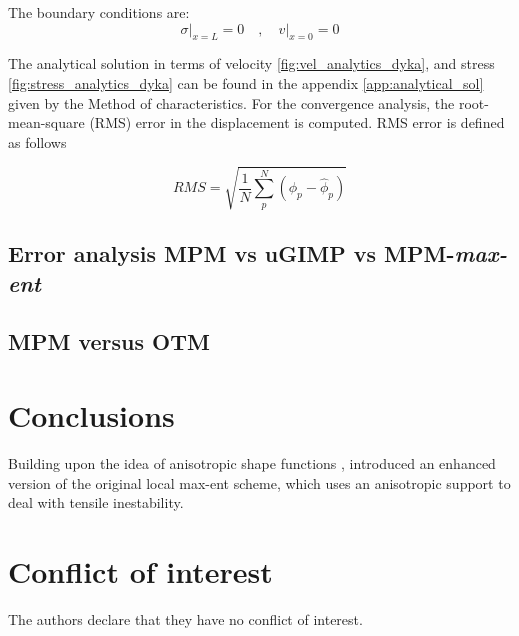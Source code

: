 The boundary conditions are:
\begin{equation}
  \label{eq:3}
  \sigma \rvert_{x=L} = 0 \quad , \quad v \rvert_{x=0} = 0
\end{equation}

The analytical solution in terms of velocity
\ref{fig:vel_analytics_dyka}, and stress
\ref{fig:stress_analytics_dyka} can be found in the appendix
\ref{app:analytical_sol} given by the Method of characteristics. For
the convergence analysis, the root-mean-square (RMS) error in the
displacement is computed. RMS error is defined as follows

\begin{equation}
  \label{eq:RMS}
  RMS = \sqrt{\frac{1}{N} \sum^{N}_p \left( \phi_p - \hat{\phi}_p \right)}
\end{equation}

\subsection{Error analysis MPM vs uGIMP vs MPM-\textit{max-ent}}
\label{sec:study-error}



\subsection{MPM versus OTM}
\label{sec:mpm-versus-otm}


\section{Conclusions}
\label{sec:conclusions}

Building upon the idea of anisotropic shape functions
\cite{Arroyo2006}, \cite{Kochmann2019} introduced an enhanced version of the
original local max-ent scheme, which uses an anisotropic support to
deal with tensile inestability.



%
\section*{Conflict of interest}
%
The authors declare that they have no conflict of interest.


